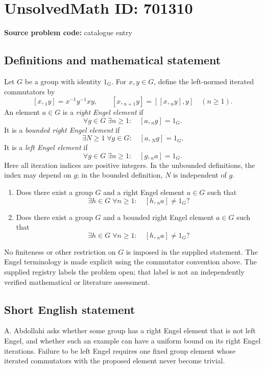 \documentclass[11pt]{article}
\begin{document}
\section*{UnsolvedMath ID: 701310}
\textbf{Source problem code:} catalogue entry
\subsection{Definitions and mathematical statement}
Let \(G\) be a group with identity \(1_G\). For \(x,y\in G\), define the left-normed iterated commutators by
\[
[x,{}_1 y]=x^{-1}y^{-1}xy,\qquad [x,{}_{n+1}y]=[[x,{}_n y],y]\quad(n\geq 1).
\]
An element \(a\in G\) is a \emph{right Engel element} if
\[
\forall g\in G\;\exists n\geq 1:\quad [a,{}_n g]=1_G.
\]
It is a \emph{bounded right Engel element} if
\[
\exists N\geq 1\;\forall g\in G:\quad [a,{}_N g]=1_G.
\]
It is a \emph{left Engel element} if
\[
\forall g\in G\;\exists n\geq 1:\quad [g,{}_n a]=1_G.
\]
Here all iteration indices are positive integers. In the unbounded definitions, the index may depend on \(g\); in the bounded definition, \(N\) is independent of \(g\).

\begin{enumerate}
\item[(a)] Does there exist a group \(G\) and a right Engel element \(a\in G\) such that
\[
\exists h\in G\;\forall n\geq 1:\quad [h,{}_n a]\neq 1_G?
\]
\item[(b)] Does there exist a group \(G\) and a bounded right Engel element \(a\in G\) such that
\[
\exists h\in G\;\forall n\geq 1:\quad [h,{}_n a]\neq 1_G?
\]
\end{enumerate}
No finiteness or other restriction on \(G\) is imposed in the supplied statement. The Engel terminology is made explicit using the commutator convention above. The supplied registry labels the problem open; that label is not an independently verified mathematical or literature assessment.
\subsection{Short English statement}
A. Abdollahi asks whether some group has a right Engel element that is not left Engel, and whether such an example can have a uniform bound on its right Engel iterations. Failure to be left Engel requires one fixed group element whose iterated commutators with the proposed element never become trivial.
\end{document}
